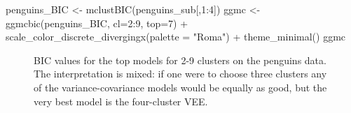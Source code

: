 \documentclass[
  letterpaper,
]{krantz}
\newenvironment{Shaded}{\begin{snugshade}}{\end{snugshade}}
\newcommand{\AttributeTok}[1]{\textcolor[rgb]{0.40,0.45,0.13}{#1}}
\newcommand{\DecValTok}[1]{\textcolor[rgb]{0.68,0.00,0.00}{#1}}
\newcommand{\FunctionTok}[1]{\textcolor[rgb]{0.28,0.35,0.67}{#1}}
\newcommand{\NormalTok}[1]{\textcolor[rgb]{0.00,0.23,0.31}{#1}}
\newcommand{\OtherTok}[1]{\textcolor[rgb]{0.00,0.23,0.31}{#1}}
\newcommand{\SpecialCharTok}[1]{\textcolor[rgb]{0.37,0.37,0.37}{#1}}
\newcommand{\StringTok}[1]{\textcolor[rgb]{0.13,0.47,0.30}{#1}}
\begin{document}
\begin{Shaded}
\begin{Highlighting}[]
\NormalTok{penguins\_BIC }\OtherTok{\textless{}{-}} \FunctionTok{mclustBIC}\NormalTok{(penguins\_sub[,}\DecValTok{1}\SpecialCharTok{:}\DecValTok{4}\NormalTok{])}
\NormalTok{ggmc }\OtherTok{\textless{}{-}} \FunctionTok{ggmcbic}\NormalTok{(penguins\_BIC, }\AttributeTok{cl=}\DecValTok{2}\SpecialCharTok{:}\DecValTok{9}\NormalTok{, }\AttributeTok{top=}\DecValTok{7}\NormalTok{) }\SpecialCharTok{+} 
  \FunctionTok{scale\_color\_discrete\_divergingx}\NormalTok{(}\AttributeTok{palette =} \StringTok{"Roma"}\NormalTok{) }\SpecialCharTok{+}
  \FunctionTok{theme\_minimal}\NormalTok{() }
\NormalTok{ggmc}
\end{Highlighting}
\end{Shaded}

\begin{figure}[H]


\caption{\label{fig-penguins-bic}BIC values for the top models for 2-9
clusters on the penguins data. The interpretation is mixed: if one were
to choose three clusters any of the variance-covariance models would be
equally as good, but the very best model is the four-cluster VEE.}

\end{figure}%
\end{document}
